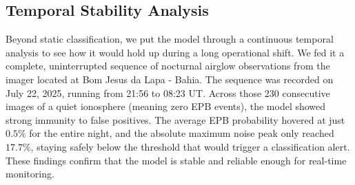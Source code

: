 \subsection{Temporal Stability Analysis}
Beyond static classification, we put the model through a continuous temporal analysis to see how it would hold up during a long operational shift. We fed it a complete, uninterrupted sequence of nocturnal airglow observations from the imager located at Bom Jesus da Lapa - Bahia. The sequence was recorded on July 22, 2025, running from 21:56 to 08:23 UT. Across those 230 consecutive images of a quiet ionosphere (meaning zero EPB events), the model showed strong immunity to false positives. The average EPB probability hovered at just $0.5\%$ for the entire night, and the absolute maximum noise peak only reached $17.7\%$, staying safely below the threshold that would trigger a classification alert. These findings confirm that the model is stable and reliable enough for real-time monitoring.
